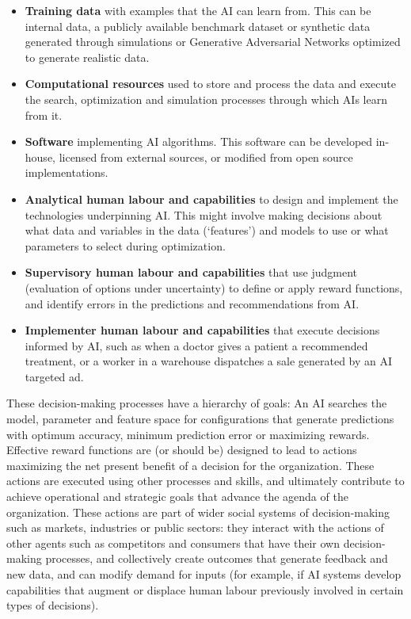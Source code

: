 \documentclass[11pt]{article}
\begin{document}
\begin{itemize}
    \item \textbf{Training data} with examples that the AI can learn from. This can be internal data, a publicly available benchmark dataset or synthetic data generated through simulations or Generative Adversarial Networks optimized to generate realistic data.
    \item \textbf{Computational resources} used to store and process the data and execute the search, optimization and simulation processes through which AIs learn from it.
    \item \textbf{Software} implementing AI algorithms. This software can be developed in-house, licensed from external sources, or modified from open source implementations. 
    \item \textbf{Analytical human labour and capabilities} to design and implement the technologies underpinning AI. This might involve making decisions about what data and variables in the data (`features') and models to use or what parameters to select during optimization.
    \item \textbf{Supervisory human labour and capabilities} that use judgment (evaluation of options under uncertainty) to define or apply reward functions, and identify errors in the predictions and recommendations from AI.
    \item \textbf{Implementer human labour and capabilities} that execute decisions informed by AI, such as when a doctor gives a patient a recommended treatment, or a worker in a warehouse dispatches a sale generated by an AI targeted ad.
\end{itemize}

These decision-making processes have a hierarchy of goals: An AI searches the model, parameter and feature space for configurations that generate predictions with optimum accuracy, minimum prediction error or maximizing rewards. Effective reward functions are (or should be) designed to lead to actions maximizing the net present benefit of a decision for the organization. These actions are executed using other processes and skills, and ultimately contribute to achieve operational and strategic goals that advance the agenda of the organization. These actions are part of wider social systems of decision-making such as markets, industries or public sectors: they interact with the actions of other agents such as competitors and consumers that have their own decision-making processes, and collectively create outcomes that generate feedback and new data, and can modify demand for inputs (for example, if AI systems develop capabilities that augment or displace human labour previously involved in certain types of decisions). 
\end{document}
